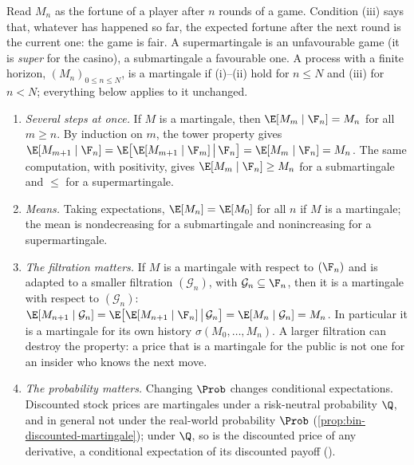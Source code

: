 Read $M_n$ as the fortune of a player after $n$ rounds of a game. Condition (iii) says that,
whatever has happened so far, the expected fortune after the next round is the current one:
the game is fair. A supermartingale is an unfavourable game (it is \emph{super} for the
casino), a submartingale a favourable one. A process with a finite horizon,
$(M_n)_{0\le n\le N}$, is a martingale if (i)--(ii) hold for $n\le N$ and (iii) for $n<N$;
everything below applies to it unchanged.

\begin{remark}\label{rem:mg-consequences}
\leavevmode
\begin{enumerate}[label=(\alph*)]
  \item \emph{Several steps at once.} If $M$ is a martingale, then $\E[M_m\mid\F_n]=M_n$ for
    all $m\ge n$. By induction on $m$, the tower property gives
    $\E[M_{m+1}\mid\F_n]=\E\big[\E[M_{m+1}\mid\F_m]\,\big|\,\F_n\big]=\E[M_m\mid\F_n]=M_n$.
    The same computation, with positivity, gives $\E[M_m\mid\F_n]\ge M_n$ for a submartingale
    and $\le$ for a supermartingale.
  \item \emph{Means.} Taking expectations, $\E[M_n]=\E[M_0]$ for all $n$ if $M$ is a
    martingale; the mean is nondecreasing for a submartingale and nonincreasing for a
    supermartingale.
  \item \emph{The filtration matters.} If $M$ is a martingale with respect to $(\F_n)$ and is
    adapted to a smaller filtration $(\mathcal G_n)$, with $\mathcal G_n\subseteq\F_n$, then it
    is a martingale with respect to $(\mathcal G_n)$:
    $\E[M_{n+1}\mid\mathcal G_n]=\E\big[\E[M_{n+1}\mid\F_n]\,\big|\,\mathcal G_n\big]=\E[M_n\mid\mathcal G_n]=M_n$.
    In particular it is a martingale for its own history $\sigma(M_0,\dots,M_n)$. A larger
    filtration can destroy the property: a price that is a martingale for the public is
    not one for an insider who knows the next move.
  \item \emph{The probability matters.} Changing $\Prob$ changes conditional expectations.
    Discounted stock prices are martingales under a risk-neutral probability $\Q$, and in
    general not under the real-world probability $\Prob$
    (\cref{prop:bin-discounted-martingale}); under $\Q$, so is the
    discounted price of any derivative, a conditional expectation of its discounted payoff
    ().
\end{enumerate}
\end{remark}

